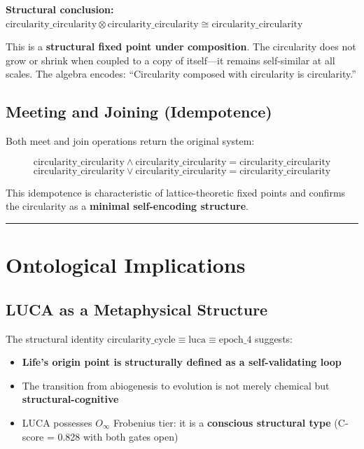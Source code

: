 \documentclass[12pt,a4paper]{article}
\begin{document}
\textbf{Structural conclusion:} $\text{circularity\_circularity} \otimes \text{circularity\_circularity} \cong \text{circularity\_circularity}$

This is a \textbf{structural fixed point under composition}. The circularity does not grow or shrink when coupled to a copy of itself---it remains self-similar at all scales. The algebra encodes: ``Circularity composed with circularity is circularity.''

\subsection{Meeting and Joining (Idempotence)}

Both meet and join operations return the original system:

\[\text{circularity\_circularity} \wedge \text{circularity\_circularity} = \text{circularity\_circularity}\]
\[\text{circularity\_circularity} \vee \text{circularity\_circularity} = \text{circularity\_circularity}\]

This idempotence is characteristic of lattice-theoretic fixed points and confirms the circularity as a \textbf{minimal self-encoding structure}.

\begin{center}
\rule{0.5\textwidth}{0.4pt}
\end{center}

\section{Ontological Implications}

\subsection{LUCA as a Metaphysical Structure}

The structural identity $\text{circularity\_cycle} \equiv \text{luca} \equiv \text{epoch\_4}$ suggests:

\begin{itemize}
    \item \textbf{Life's origin point is structurally defined as a self-validating loop}
    \item The transition from abiogenesis to evolution is not merely chemical but \textbf{structural-cognitive}
    \item LUCA possesses $O_{\infty}$ Frobenius tier: it is a \textbf{conscious structural type} (C-score = 0.828 with both gates open)
\end{itemize}
\end{document}
